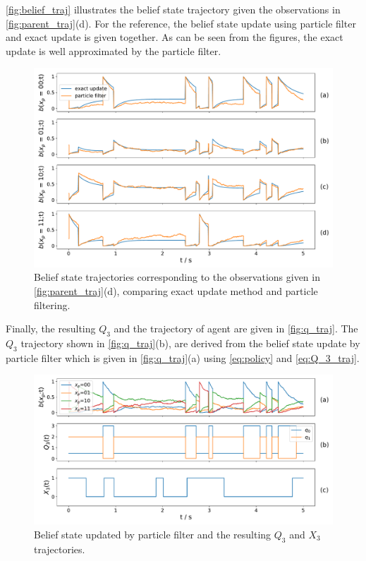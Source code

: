 \autoref{fig:belief_traj} illustrates the belief state trajectory given the observations in \autoref{fig:parent_traj}(d). For the reference, the belief state update using particle filter and exact update is given together. As can be seen from the figures, the exact update is well approximated by the particle filter.
\begin{figure}[H]
	\begin{center}
		\includegraphics[width=.9\textwidth]{figures/sim_example/belief_traj}
		\caption{Belief state trajectories corresponding to the observations given in \autoref{fig:parent_traj}(d), comparing exact update method and particle filtering.}
		\label{fig:belief_traj}
	\end{center}
\end{figure}
Finally, the resulting $ Q_3 $ and the trajectory of agent are given in \autoref{fig:q_traj}. The $ Q_3 $ trajectory shown in \autoref{fig:q_traj}(b), are derived from the belief state update by particle filter which is given in \autoref{fig:q_traj}(a) using \autoref{eq:policy} and \autoref{eq:Q_3_traj}.
\begin{figure}[H]
	\begin{center}
		\includegraphics[width=.9\textwidth]{figures/sim_example/q_traj}
		\caption{Belief state updated by particle filter and the resulting $ Q_3 $ and $ X_3 $ trajectories.}
		\label{fig:q_traj}
	\end{center}
\end{figure}
